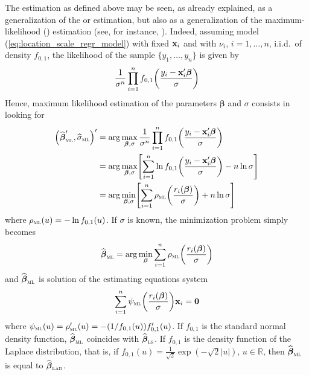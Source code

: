 The  estimation as defined above may be seen, as already explained, as
a generalization of the  or  estimation, but also as a
generalization of the maximum-likelihood () estimation (see, for
instance, \citealp{maronna:etal:2006}). Indeed, assuming model
(\ref{eq:location_scale_regr_model}) with fixed $\mathbf x_{i}$ and with
$\nu_{i}$, $i = 1, \dots, n$, i.i.d.\ of density $f_{0,1}$, the likelihood of
the sample $\{y_{1}, \dots, y_{n}\}$ is given by                                
\[
    \frac{1}{\sigma^{n}}\prod\limits_{i=1}^{n}
    f_{0,1}\left(\frac{y_{i}-\stvec{x}_{i}'\boldsymbol\beta}{\sigma}\right)
\]
Hence, maximum likelihood estimation of the parameters $\boldsymbol\beta$
and $\sigma$ consists in looking for
%
\begin{align}
    \left(\sthat{\boldsymbol\beta}_{\stsc{ML}}',\sthat{\sigma}_{\stsc{ML}}\right)'
    &= \arg\max_{\boldsymbol\beta,\sigma} \frac{1}{\sigma^{n}} \prod\limits_{i=1}^{n}
        f_{0,1}\left(\frac{y_{i}-\stvec{x}_{i}'\boldsymbol\beta}{\sigma}\right)
    \nonumber\\
    &= \arg\max_{\boldsymbol\beta,\sigma} \left[\sum_{i=1}^{n}
        \ln f_{0,1}\left(\frac{y_{i}-\stvec{x}_{i}'\boldsymbol\beta}{\sigma}\right) - n\ln\sigma\right]
    \nonumber\\
    & = \arg\min_{\boldsymbol\beta,\sigma} \left[\sum_{i=1}^{n}
        \rho_{\stsc{ML}}\left(\frac{r_{i}(\boldsymbol\beta)}{\sigma}\right) + n\ln\sigma\right]
    \label{eq:ML_beta_sigma_min}
\end{align}
%
where $\rho_{\stsc{ML}}(u) = -\ln f_{0,1}(u)$. If $\sigma$ is known, the
minimization problem simply becomes
%
\begin{equation}\label{eq:ML_beta_min}
    \sthat{\boldsymbol\beta}_{\stsc{ML}} 
        = \arg\min_{\boldsymbol\beta}\sum_{i=1}^{n} 
            \rho_{\stsc{ML}}\left(\frac{r_{i}(\boldsymbol\beta)}{\sigma}\right)
\end{equation}
%
and $\sthat{\boldsymbol\beta}_{\stsc{ML}}$ is solution of the estimating
equations system
\[
    \sum_{i=1}^{n} \psi_{\stsc{ML}}\left(\frac{r_{i}(\boldsymbol\beta)}{\sigma}\right) \stvec{x}_{i} = \mathbf{0}
\]
where $\psi_{\stsc{ML}}(u) = \rho_{\stsc{ML}}'(u) = - (1/f_{0,1}(u))
f_{0,1}'(u)$. If $f_{0,1}$ is the standard normal density function,
$\sthat{\boldsymbol\beta}_{\stsc{ML}}$ coincides with
$\sthat{\boldsymbol\beta}_{\stsc{LS}}$. If $f_{0,1}$ is the density function of
the Laplace distribution, that is, if $f_{0,1}(u) =
\frac{1}{\sqrt{2}}\exp(-\sqrt{2}|u|)$, $u\in\mathbb{R}$, then
$\sthat{\boldsymbol\beta}_{\stsc{ML}}$ is equal to
$\sthat{\boldsymbol\beta}_{\stsc{LAD}}$.

